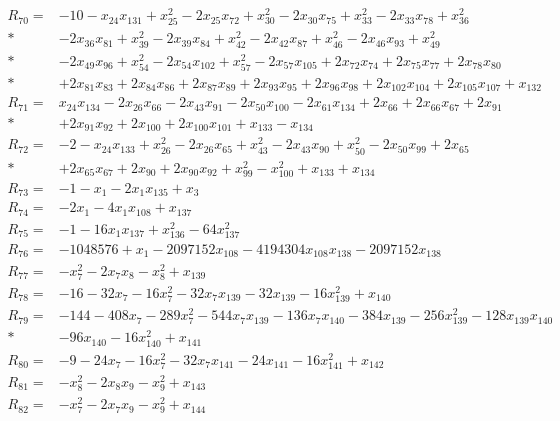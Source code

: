 \begin{align*}
R_{70}={}&-10-x_{24}x_{131}+x_{25}^{2}-2x_{25}x_{72}+x_{30}^{2}-2x_{30}x_{75}+x_{33}^{2}-2x_{33}x_{78}+x_{36}^{2}\\*
&-2x_{36}x_{81}+x_{39}^{2}-2x_{39}x_{84}+x_{42}^{2}-2x_{42}x_{87}+x_{46}^{2}-2x_{46}x_{93}+x_{49}^{2}\\*
&-2x_{49}x_{96}+x_{54}^{2}-2x_{54}x_{102}+x_{57}^{2}-2x_{57}x_{105}+2x_{72}x_{74}+2x_{75}x_{77}+2x_{78}x_{80}\\*
&+2x_{81}x_{83}+2x_{84}x_{86}+2x_{87}x_{89}+2x_{93}x_{95}+2x_{96}x_{98}+2x_{102}x_{104}+2x_{105}x_{107}+x_{132}\\[3pt]
R_{71}={}&x_{24}x_{134}-2x_{26}x_{66}-2x_{43}x_{91}-2x_{50}x_{100}-2x_{61}x_{134}+2x_{66}+2x_{66}x_{67}+2x_{91}\\*
&+2x_{91}x_{92}+2x_{100}+2x_{100}x_{101}+x_{133}-x_{134}\\[3pt]
R_{72}={}&-2-x_{24}x_{133}+x_{26}^{2}-2x_{26}x_{65}+x_{43}^{2}-2x_{43}x_{90}+x_{50}^{2}-2x_{50}x_{99}+2x_{65}\\*
&+2x_{65}x_{67}+2x_{90}+2x_{90}x_{92}+x_{99}^{2}-x_{100}^{2}+x_{133}+x_{134}\\[3pt]
R_{73}={}&-1-x_{1}-2x_{1}x_{135}+x_{3}\\[3pt]
R_{74}={}&-2x_{1}-4x_{1}x_{108}+x_{137}\\[3pt]
R_{75}={}&-1-16x_{1}x_{137}+x_{136}^{2}-64x_{137}^{2}\\[3pt]
R_{76}={}&-1048576+x_{1}-2097152x_{108}-4194304x_{108}x_{138}-2097152x_{138}\\[3pt]
R_{77}={}&-x_{7}^{2}-2x_{7}x_{8}-x_{8}^{2}+x_{139}\\[3pt]
R_{78}={}&-16-32x_{7}-16x_{7}^{2}-32x_{7}x_{139}-32x_{139}-16x_{139}^{2}+x_{140}\\[3pt]
R_{79}={}&-144-408x_{7}-289x_{7}^{2}-544x_{7}x_{139}-136x_{7}x_{140}-384x_{139}-256x_{139}^{2}-128x_{139}x_{140}\\*
&-96x_{140}-16x_{140}^{2}+x_{141}\\[3pt]
R_{80}={}&-9-24x_{7}-16x_{7}^{2}-32x_{7}x_{141}-24x_{141}-16x_{141}^{2}+x_{142}\\[3pt]
R_{81}={}&-x_{8}^{2}-2x_{8}x_{9}-x_{9}^{2}+x_{143}\\[3pt]
R_{82}={}&-x_{7}^{2}-2x_{7}x_{9}-x_{9}^{2}+x_{144}\\[3pt]

\end{align*}
